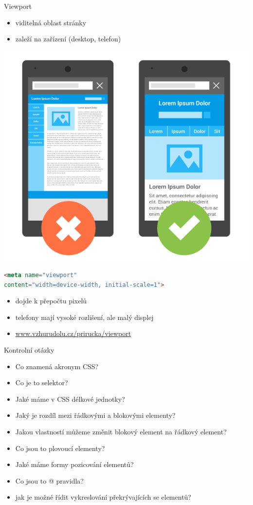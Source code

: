 \documentclass{beamer}
\begin{document}
\begin{frame}[fragile, shrink=0]{Viewport}
\begin{itemize}
	\item viditelná oblast stránky
	\item zaleží na zařízení (desktop, telefon)
\end{itemize} 

 \includegraphics[scale=0.3]{viewport}


\begin{lstlisting}[language=HTML]
<meta name="viewport" 
content="width=device-width, initial-scale=1">
\end{lstlisting}
\begin{itemize}
	\item dojde k přepočtu pixelů
	\item telefony mají vysoké rozlišení, ale malý displej
	\item \url{www.vzhurudolu.cz/prirucka/viewport}
\end{itemize}

\end{frame}



\begin{frame}{Kontrolní otázky}
\begin{itemize}
	\item Co znamená akronym CSS?
	\item Co je to selektor?
	\item Jaké máme v CSS délkové jednotky?
	\item Jaký je rozdíl mezi řádkovými a blokovými elementy?
	\item Jakou vlastností můžeme změnit blokový element na řádkový element?
	\item Co jsou to plovoucí elementy?
	\item Jaké máme formy pozicování elementů?
	\item Co jsou to @ pravidla?
	\item jak je možné řídit vykreslování překrývajících se elementů?  
\end{itemize}
	
\end{frame}
\end{document}
